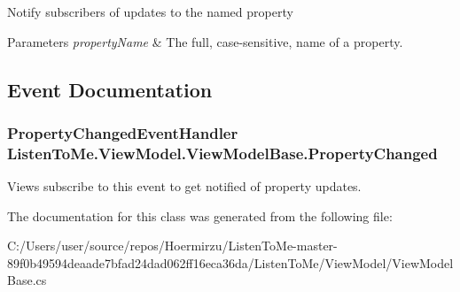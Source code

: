 Notify subscribers of updates to the named property 


\begin{DoxyParams}{Parameters}
{\em property\+Name} & The full, case-\/sensitive, name of a property.\\
\hline
\end{DoxyParams}


\subsection{Event Documentation}
\subsubsection[{\texorpdfstring{Property\+Changed}{PropertyChanged}}]{\setlength{\rightskip}{0pt plus 5cm}Property\+Changed\+Event\+Handler Listen\+To\+Me.\+View\+Model.\+View\+Model\+Base.\+Property\+Changed}\hypertarget{class_listen_to_me_1_1_view_model_1_1_view_model_base_ae448ae2d936921e058563627fae0292b}{}\label{class_listen_to_me_1_1_view_model_1_1_view_model_base_ae448ae2d936921e058563627fae0292b}


Views subscribe to this event to get notified of property updates. 



The documentation for this class was generated from the following file\+:\begin{DoxyCompactItemize}
\item 
C\+:/\+Users/user/source/repos/\+Hoermirzu/\+Listen\+To\+Me-\/master-\/89f0b49594deaade7bfad24dad062ff16eca36da/\+Listen\+To\+Me/\+View\+Model/View\+Model\+Base.\+cs\end{DoxyCompactItemize}
